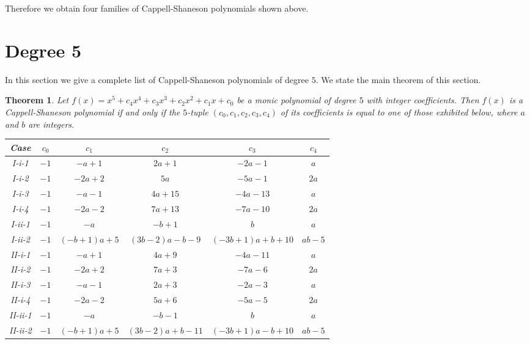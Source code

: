 \documentclass{amsart}
\theoremstyle{plain}
\newtheorem{thm}{Theorem}[section]
\theoremstyle{definition}
\theoremstyle{remark}
\begin{document}
Therefore we obtain four families of Cappell-Shaneson polynomials shown above. 




\section{Degree 5}


In this section we give a complete list of Cappell-Shaneson polynomials of degree $5$. 
We state the main theorem of this section. 

\begin{thm}\label{CS5}
Let $f(x)=x^5+c_4x^4+c_3x^3+c_2x^2+c_1x+c_0$ be 
a monic polynomial of degree $5$ with integer coefficients. 
Then $f(x)$ is a Cappell-Shaneson polynomial if and only if the $5$-tuple $(c_0,c_1,c_2,c_3,c_4)$ of 
its coefficients is equal to one of those exhibited below, where $a$ and $b$ are integers. 


\begin{longtable}{|c|c|c|c|c|c|} \hline 
{\rm Case} & $c_0$ & $c_1$ & $c_2$ & $c_3$ & $c_4$ \\ \hline 
{\rm I-i-1} & $-1$ & $-a+1$ & $2a+1$ & $-2a-1$ & $a$ \\ \hline
{\rm I-i-2} & $-1$ & $-2a+2$ & $5a$ & $-5a-1$ & $2a$ \\ \hline
{\rm I-i-3} & $-1$ & $-a-1$ & $4a+15$ & $-4a-13$ & $a$ \\ \hline
{\rm I-i-4} & $-1$ & $-2a-2$ & $7a+13$ & $-7a-10$ & $2a$ \\ \hline
{\rm I-ii-1} & $-1$ & $-a$ & $-b+1$ & $b$ & $a$ \\ \hline
{\rm I-ii-2} & $-1$ & $(-b+1)a+5$ & $(3b-2)a-b-9$ & $(-3b+1)a+b+10$ & $ab-5$ \\ \hline
{\rm II-i-1} & $-1$ & $-a+1$ & $4a+9$ & $-4a-11$ & $a$ \\ \hline
{\rm II-i-2} & $-1$ & $-2a+2$ & $7a+3$ & $-7a-6$ & $2a$ \\ \hline
{\rm II-i-3} & $-1$ & $-a-1$ & $2a+3$ & $-2a-3$ & $a$ \\ \hline
{\rm II-i-4} & $-1$ & $-2a-2$ & $5a+6$ & $-5a-5$ & $2a$ \\ \hline
{\rm II-ii-1} & $-1$ & $-a$ & $-b-1$ & $b$ & $a$ \\ \hline
{\rm II-ii-2} & $-1$ & $(-b+1)a+5$ & $(3b-2)a+b-11$ & $(-3b+1)a-b+10$ & $ab-5$ \\ \hline
\end{longtable} 

\end{thm}
\end{document}
